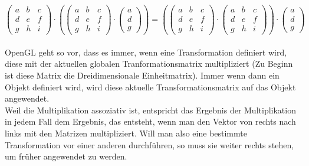 \[
    \begin{pmatrix}
        a & b & c \\
        d & e & f \\
        g & h & i
    \end{pmatrix}
    \cdot
    \left(
    \begin{pmatrix}
            a & b & c \\
            d & e & f \\
            g & h & i
        \end{pmatrix}
    \cdot
    \begin{pmatrix}
            a \\
            d \\
            g
        \end{pmatrix}
    \right)
    =
    \left(
    \begin{pmatrix}
            a & b & c \\
            d & e & f \\
            g & h & i
        \end{pmatrix}
    \cdot
    \begin{pmatrix}
            a & b & c \\
            d & e & f \\
            g & h & i
        \end{pmatrix}
    \right)
    \cdot
    \begin{pmatrix}
        a \\
        d \\
        g
    \end{pmatrix}
\]
\\

OpenGL geht so vor, dass es immer, wenn eine Transformation definiert wird, diese mit der aktuellen globalen Tranformationsmatrix multipliziert (Zu Beginn ist diese Matrix die Dreidimensionale Einheitmatrix). Immer wenn dann ein Objekt definiert wird, wird diese aktuelle Transformationsmatrix auf das Objekt angewendet.\\
Weil die Multiplikation assoziativ ist, entspricht das Ergebnis der Multiplikation in jedem Fall dem Ergebnis, das entsteht, wenn man den Vektor von rechts nach links mit den Matrizen multipliziert. Will man also eine bestimmte Transformation vor einer anderen durchführen, so muss sie weiter rechts stehen, um früher angewendet zu werden.

